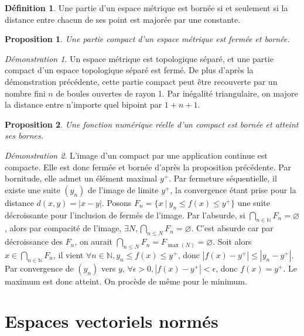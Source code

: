 \documentclass[a4paper, 11pt, french]{book}
\theoremstyle{plain} %
\newtheorem{proposition}{Proposition}
\theoremstyle{definition} %
\newtheorem{definition}{Définition}
\theoremstyle{remark} %
\newtheorem*{demonstration}{Démonstration}
\newcommand{\1}{\mathds{1}}
\newcommand\vide{\varnothing}
\newcommand{\N}{\mathbb{N}}
\newcommand\ens[2]{\{#1 \ |\ #2\}}
\begin{document}
\begin{definition}
	Une partie d'un espace métrique est bornée si et seulement si la distance entre chacun de ses point est majorée par une constante.
\end{definition}

\begin{proposition}
	Une partie compact d'un espace métrique est fermée et bornée.
\end{proposition}

\begin{demonstration}
	Un espace métrique est topologique séparé, et une partie compact d'un espace topologique séparé est fermé.
	De plus d'après la démonstration précédente, cette partie compact peut être recouverte par un nombre fini $n$ de boules ouvertes de rayon 1.
	Par inégalité triangulaire, on majore la distance entre n'importe quel bipoint par $1+n+1$.
\end{demonstration}

\begin{proposition}
	Une fonction numérique réelle d'un compact est bornée et atteint ses bornes.
\end{proposition}

\begin{demonstration}
	L’image d'un compact par une application continue est compacte.
	Elle est donc fermée et bornée d'après la proposition précédente.
	Par bornitude, elle admet un élément maximal $y^+$.
	Par fermeture séquentielle, il existe une suite $(y_n)$ de l'image de limite $y^+$, la convergence étant prise pour la distance $d(x, y)=|x-y|$.
	Posons $F_n=\ens{x}{y_n\leqslant f(x)\leqslant y^+}$ une suite décroissante pour l'inclusion de fermés de l'image.
	Par l'absurde, si $\bigcap_{n\in\N}F_n=\vide$, alors par compacité de l'image, $\exists N, \bigcap_{n\leqslant N}F_n=\vide$.
	C'est absurde car par décroissance des $F_n$, on aurait $\bigcap_{n\leqslant N}F_n=F_{\max(N)}=\vide$.
	Soit alors $x\in\bigcap_{n\in\N}F_n$, il vient $\forall n\in\N, y_n\leqslant f(x)\leqslant y^+$, donc $|f(x)-y^+| \leqslant |y_n-y^+|$.
	Par convergence de $(y_n)$ vers $y$, $\forall\epsilon>0, |f(x)-y^+|<\epsilon$, donc $f(x)=y^+$.
	Le maximum est donc atteint.
	On procède de même pour le minimum.
\end{demonstration}

\chapter{Espaces vectoriels normés}
\end{document}
